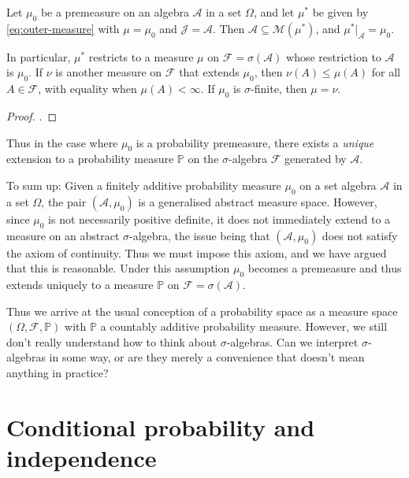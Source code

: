 \documentclass[article, a4paper, 11pt, oneside]{memoir}
\numberwithin{equation}{chapter}
\newcommand{\calF}{\mathcal{F}}
\newcommand{\calA}{\mathcal{A}}
\newcommand{\calJ}{\mathcal{J}}
\newcommand{\calM}{\mathcal{M}}
\renewcommand{\P}{\mathbb{P}}
\begin{document}
\begin{theorem}
    Let $\mu_0$ be a premeasure on an algebra $\calA$ in a set $\Omega$, and let $\mu^*$ be given by \cref{eq:outer-measure} with $\mu = \mu_0$ and $\calJ = \calA$. Then $\calA \subseteq \calM(\mu^*)$, and $\mu^*|_\calA = \mu_0$.

    In particular, $\mu^*$ restricts to a measure $\mu$ on $\calF = \sigma(\calA)$ whose restriction to $\calA$ is $\mu_0$. If $\nu$ is another measure on $\calF$ that extends $\mu_0$, then $\nu(A) \leq \mu(A)$ for all $A \in \calF$, with equality when $\mu(A) < \infty$. If $\mu_0$ is $\sigma$-finite, then $\mu = \nu$.
\end{theorem}

\begin{proof}
    \textcite[Theorem~1.14]{folland2007}.
\end{proof}
%
Thus in the case where $\mu_0$ is a probability premeasure, there exists a \emph{unique} extension to a probability measure $\P$ on the $\sigma$-algebra $\calF$ generated by $\calA$.

To sum up: Given a finitely additive probability measure $\mu_0$ on a set algebra $\calA$ in a set $\Omega$, the pair $(\calA,\mu_0)$ is a generalised abstract measure space. However, since $\mu_0$ is not necessarily positive definite, it does not immediately extend to a measure on an abstract $\sigma$-algebra, the issue being that $(\calA,\mu_0)$ does not satisfy the axiom of continuity. Thus we must impose this axiom, and we have argued that this is reasonable. Under this assumption $\mu_0$ becomes a premeasure and thus extends uniquely to a measure $\P$ on $\calF = \sigma(\calA)$.

Thus we arrive at the usual conception of a probability space as a measure space $(\Omega,\calF,\P)$ with $\P$ a countably additive probability measure. However, we still don't really understand how to think about $\sigma$-algebras. Can we interpret $\sigma$-algebras in some way, or are they merely a convenience that doesn't mean anything in practice?


\section{Conditional probability and independence}
\label{sec:independence}
\end{document}

